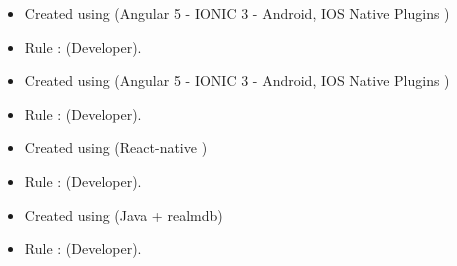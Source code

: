 \documentclass[10pt,a4paper]{altacv}
\begin{document}
\medskip
\divider
{}
  \begin{itemize}
\item Created using (Angular 5  - IONIC 3 - Android, IOS Native Plugins ) 
\item Rule : (Developer). 
\end{itemize}

\medskip

\divider
{}
  \begin{itemize}
\item Created using (Angular 5  - IONIC 3 - Android, IOS Native Plugins ) 
\item Rule : (Developer). 
\end{itemize}
\medskip
\divider
{}
  \begin{itemize}
\item Created using (React-native ) 
\item Rule : (Developer). 
\end{itemize}
\medskip
\divider
{}
  \begin{itemize}
\item Created using  (Java + realmdb)
\item Rule : (Developer). 
\end{itemize}
\medskip
 

 
\clearpage
 
\end{document}
